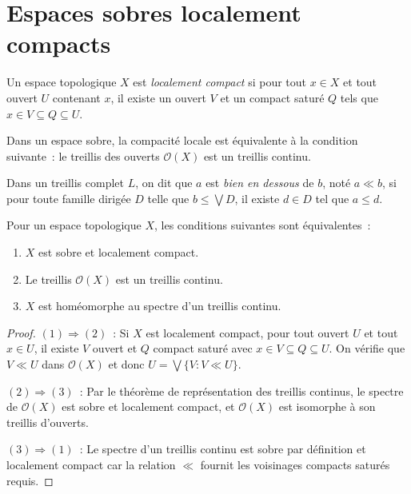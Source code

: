 \section{Espaces sobres localement compacts}

\begin{definition}
Un espace topologique $X$ est \emph{localement compact} si pour tout $x \in X$ et tout
ouvert $U$ contenant $x$, il existe un ouvert $V$ et un compact satur\'e $Q$ tels que
$x \in V \subseteq Q \subseteq U$.
\end{definition}

\begin{proposition}
Dans un espace sobre, la compacit\'e locale est \'equivalente \`a la condition suivante~:
le treillis des ouverts $\mathcal{O}(X)$ est un treillis continu.
\end{proposition}

\begin{definition}
Dans un treillis complet $L$, on dit que $a$ est \emph{bien en dessous} de $b$, not\'e
$a \ll b$, si pour toute famille dirig\'ee $D$ telle que $b \leq \bigvee D$, il existe
$d \in D$ tel que $a \leq d$.
\end{definition}

\begin{theoreme}
\label{thm:sobre-lc}
Pour un espace topologique $X$, les conditions suivantes sont \'equivalentes~:
\begin{enumerate}
  \item $X$ est sobre et localement compact.
  \item Le treillis $\mathcal{O}(X)$ est un treillis continu.
  \item $X$ est hom\'eomorphe au spectre d'un treillis continu.
\end{enumerate}
\end{theoreme}

\begin{proof}
$(1) \Rightarrow (2)$~: Si $X$ est localement compact, pour tout ouvert $U$ et tout
$x \in U$, il existe $V$ ouvert et $Q$ compact satur\'e avec $x \in V \subseteq Q \subseteq U$.
On v\'erifie que $V \ll U$ dans $\mathcal{O}(X)$ et donc $U = \bigvee \{V : V \ll U\}$.

$(2) \Rightarrow (3)$~: Par le th\'eor\`eme de repr\'esentation des treillis continus, le
spectre de $\mathcal{O}(X)$ est sobre et localement compact, et $\mathcal{O}(X)$ est
isomorphe \`a son treillis d'ouverts.

$(3) \Rightarrow (1)$~: Le spectre d'un treillis continu est sobre par d\'efinition et
localement compact car la relation $\ll$ fournit les voisinages compacts satur\'es requis.
\end{proof}

